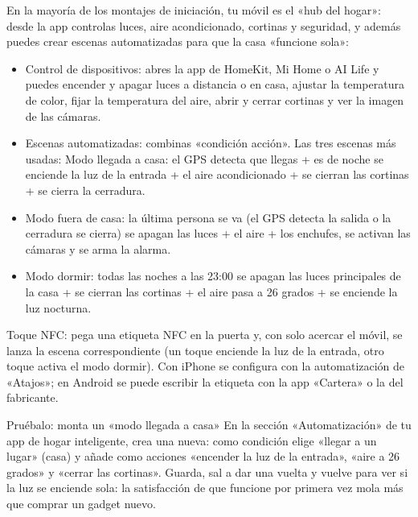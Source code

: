 
En la mayoría de los montajes de iniciación, tu móvil es el «hub del hogar»: desde la app controlas luces, aire acondicionado, cortinas y seguridad, y además puedes crear escenas automatizadas para que la casa «funcione sola»:

\begin{itemize}
  \item Control de dispositivos: abres la app de HomeKit, Mi Home o AI Life y puedes encender y apagar luces a distancia o en casa, ajustar la temperatura de color, fijar la temperatura del aire, abrir y cerrar cortinas y ver la imagen de las cámaras.
  \item Escenas automatizadas: combinas «condición acción». Las tres escenas más usadas: Modo llegada a casa: el GPS detecta que llegas + es de noche se enciende la luz de la entrada + el aire acondicionado + se cierran las cortinas + se cierra la cerradura.
  \item Modo fuera de casa: la última persona se va (el GPS detecta la salida o la cerradura se cierra) se apagan las luces + el aire + los enchufes, se activan las cámaras y se arma la alarma.
  \item Modo dormir: todas las noches a las 23:00 se apagan las luces principales de la casa + se cierran las cortinas + el aire pasa a 26 grados + se enciende la luz nocturna.
\end{itemize}

Toque NFC: pega una etiqueta NFC en la puerta y, con solo acercar el móvil, se lanza la escena correspondiente (un toque enciende la luz de la entrada, otro toque activa el modo dormir). Con iPhone se configura con la automatización de «Atajos»; en Android se puede escribir la etiqueta con la app «Cartera» o la del fabricante.

\begin{tcbpractice}{Pruébalo: monta un «modo llegada a casa»}
En la sección «Automatización» de tu app de hogar inteligente, crea una nueva: como condición elige «llegar a un lugar» (casa) y añade como acciones «encender la luz de la entrada», «aire a 26 grados» y «cerrar las cortinas». Guarda, sal a dar una vuelta y vuelve para ver si la luz se enciende sola: la satisfacción de que funcione por primera vez mola más que comprar un gadget nuevo.

\end{tcbpractice}


